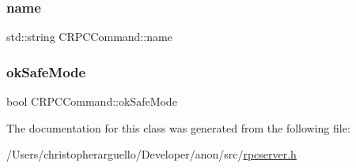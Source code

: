 \mbox{\label{class_c_r_p_c_command_a8da584c0d2d98be22ebff74d3cf2221c}} 
\subsubsection{\texorpdfstring{name}{name}}
{\footnotesize\ttfamily std\+::string C\+R\+P\+C\+Command\+::name}

\mbox{\label{class_c_r_p_c_command_a7f0b10e619917a3019f36ba5fa538adb}} 
\subsubsection{\texorpdfstring{ok\+Safe\+Mode}{okSafeMode}}
{\footnotesize\ttfamily bool C\+R\+P\+C\+Command\+::ok\+Safe\+Mode}



The documentation for this class was generated from the following file\+:\begin{DoxyCompactItemize}
\item 
/\+Users/christopherarguello/\+Developer/anon/src/\mbox{\hyperlink{rpcserver_8h}{rpcserver.\+h}}\end{DoxyCompactItemize}
